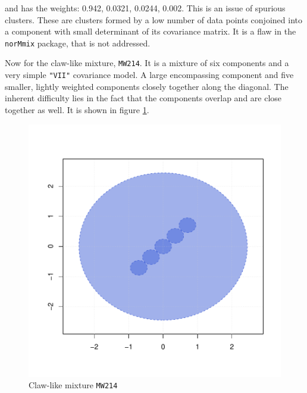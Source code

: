 and has the weights: 0.942, 0.0321, 0.0244, 0.002. This is an issue of 
spurious clusters. These are clusters formed by a low number of data points
conjoined into a component with small determinant of its covariance matrix.
It is a flaw in the {\tt norMmix} package, that is not addressed.

Now for the claw-like mixture, {\tt MW214}. It is a mixture of six components
and a very simple {\tt "VII"} covariance model. A large encompassing component
and five smaller, lightly weighted components closely together along the 
diagonal. The inherent difficulty lies in the fact that the components overlap
and are close together as well. It is shown in figure \ref{fig:MW214}.

\begin{figure}[h!]
    \begin{Rgraph}[0.9]
\includegraphics{chapter3-figMW214}
    \caption{Claw-like mixture {\tt MW214}}
    \label{fig:MW214}
    \end{Rgraph}
\end{figure}



